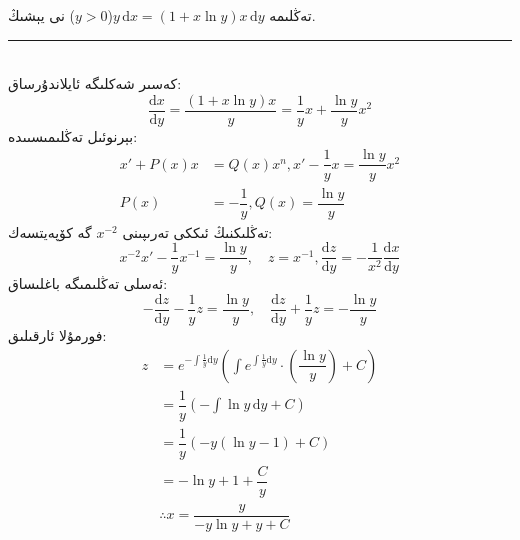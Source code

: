 \begin{myexample}
	تەڭلىمە
	$y\,\textrm{d}x=(1+x\ln y)x\,\textrm{d}y$($y>0$)
	نى يېشىڭ.
	\\\rule{\linewidth}{0.05em}\\
	كەسىر شەكلىگە ئايلاندۇرساق: 
	$$\dfrac{\textrm{d}x}{\textrm{d}y}=\dfrac{(1+x\ln y)x}{y}=\dfrac{1}{y}x+\dfrac{\ln y}{y}x^2$$
	بېرنوئىل تەڭلىمىسىىدە:
	\begin{align*}
		x'+P(x)x&=Q(x)x^n, x'-\dfrac{1}{y}x=\dfrac{\ln y}{y}x^2\\
		P(x)&=-\dfrac{1}{y}, Q(x)=\dfrac{\ln y}{y}
	\end{align*}
تەڭلىكنىڭ ئىككى تەرىپىنى
	$x^{-2}$
	گە كۆپەيتسەك:
	$$x^{-2}x'-\dfrac{1}{y}x^{-1}=\dfrac{\ln y}{y}, \quad z=x^{-1}, \dfrac{\textrm{d}z}{\textrm{d}y}=-\dfrac{1}{x^2}\dfrac{\textrm{d}x}{\textrm{d}y}$$
	ئەسلى تەڭلىمىگە باغلىساق:
	$$-\dfrac{\textrm{d}z}{\textrm{d}y}-\dfrac{1}{y}z=\dfrac{\ln y}{y}, \quad \dfrac{\textrm{d}z}{\textrm{d}y}+\dfrac{1}{y}z=-\dfrac{\ln y}{y}$$
	فورمۇلا ئارقىلىق:
	\begin{align*}
	z &= e^{-\int\frac{1}{y}\textrm{d}y}\left(\displaystyle{\int e^{\int\frac{1}{y}\textrm{d}y}\cdot\left(\dfrac{\ln y}{y}\right)+C}\right)\\
	&=  \dfrac{1}{y}(-\int\ln y\,\textrm{d}y+C)\\
	&= \dfrac{1}{y}(-y(\ln y-1)+C)\\
	&= -\ln y+1+\dfrac{C}{y}\\
	&\therefore x = \dfrac{y}{-y\ln y+y+C}
	\end{align*}
\end{myexample}

